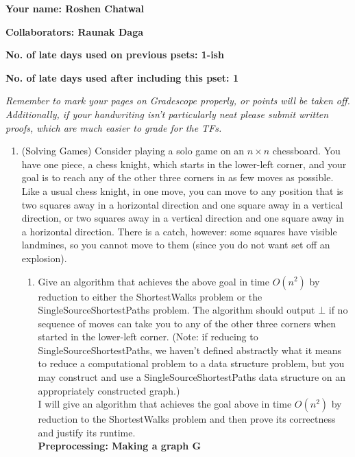 \documentclass[11pt]{article}
\begin{document}

\textbf{Your name: Roshen Chatwal}

\textbf{Collaborators: Raunak Daga}

\textbf{No. of late days used on previous psets: 1-ish }

\textbf{No. of late days used after including this pset: 1}

\medskip \noindent
\textit{Remember to mark your pages on Gradescope properly, or points will be taken off. Additionally, if your handwriting isn't particularly neat please submit written proofs, which are much easier to grade for the TFs.}

\begin{enumerate}
    \item (Solving Games) Consider playing a solo game on an $n\times n$ chessboard.  You have one piece, a chess knight, which starts in the lower-left corner, and your goal is to reach any of the other three corners in as few moves as possible.  Like a usual chess knight, in one move, you can move to any position that is two squares away in a horizontal direction and one square away in a vertical direction, or two squares away in a vertical direction and one square away in a horizontal direction.  There is a catch, however: some squares have visible landmines, so you cannot move to them (since you do not want set off an explosion). \ 

    \begin{enumerate}
    \item Give an algorithm that achieves the above goal in time $O(n^2)$ by reduction to either the ShortestWalks problem or the SingleSourceShortestPaths problem. The algorithm should output $\bot$ if no sequence of moves can take you to any of the other three corners when started in the lower-left corner. (Note: if reducing to SingleSourceShortestPaths, we haven't defined abstractly what it means to reduce a computational problem to a data structure problem, but you may construct and use a SingleSourceShortestPaths data structure on an appropriately constructed graph.) \\

    I will give an algorithm that achieves the goal above in time $O(n^2)$ by reduction to the ShortestWalks problem and then prove its correctness and justify its runtime. \\

\textbf{Preprocessing: Making a graph G} \\


\end{enumerate}
\end{enumerate}
\end{document}

